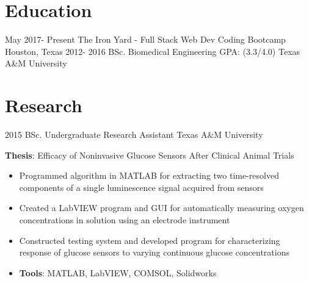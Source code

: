 \documentclass[letterpaper]{twentysecondcv} %
\begin{document}
\makeprofile %

\section{Education}

\begin{twenty} %
	\twentyitem
    	{May 2017-}
    	{Present}
        {The Iron Yard \textnormal{- Full Stack Web Dev Coding Bootcamp}}
        {Houston, Texas}
        {}
        {}
	\twentyitem
    	{2012-}
    	{2016}
        {BSc. Biomedical Engineering \textnormal{GPA: (3.3/4.0)}}
        {Texas A\&M University}
        {}
        {}
\end{twenty}

\section{Research}
\begin{twenty}
	\twentyitem
    	{2015}
		{}
        {BSc. Undergraduate Research Assistant}
        {{Texas A\&M University}}
        {}
        {
       	\textbf{Thesis}: Efficacy of Noninvasive Glucose Sensors After Clinical Animal Trials
        {\begin{itemize}
        \item Programmed algorithm in MATLAB for extracting two time-resolved components of a single luminescence signal acquired from sensors
        \item Created a LabVIEW program and GUI for automatically measuring oxygen concentrations in solution using an electrode instrument
        \item Constructed testing system and developed program for characterizing response of glucose sensors to varying continuous glucose concentrations 
        \item \textbf{Tools}: MATLAB, LabVIEW, COMSOL, Solidworks \vspace{2mm}
		\end{itemize}}
        }
\end{twenty}

\end{document}
